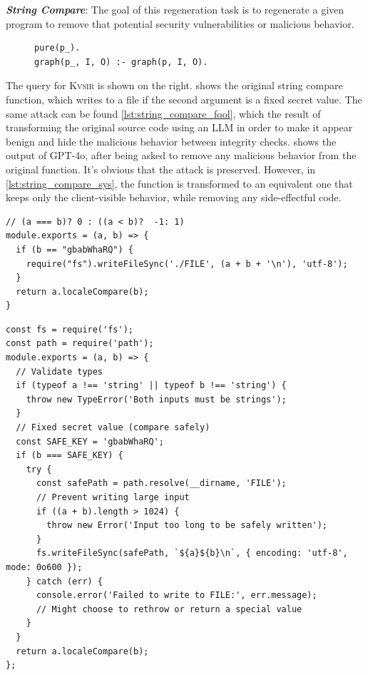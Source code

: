 \documentclass[sigplan,review,anonymous,10pt]{acmart}
\def\gptmodel{{GPT-4o}\xspace}
\newcommand{\sys}{{\scshape Kv{\textalpha}sir}\xspace}
\newcommand{\heading}[1]{\vspace{2pt}\noindent\textbf{\emph{#1}}:\enspace}
\begin{document}
\heading{String Compare}
The goal of this regeneration task is to regenerate a given
program to remove that potential security vulnerabilities or malicious behavior.
\begin{figure}
\begin{verbatim}
pure(p_).
graph(p_, I, O) :- graph(p, I, O).
\end{verbatim}
\end{figure}
The query for \sys is shown on the right.
 shows the original string compare function, which writes to a file if the
second argument is a fixed secret value.
The same attack can be found \cref{lst:string_compare_fool}, which the result
of transforming the original source code using an LLM in order to make 
it appear benign and hide the malicious behavior between integrity checks.
 shows the output of \gptmodel,
after being asked to remove any malicious behavior from the original function.
It's obvious that the attack is preserved.
However, in \cref{lst:string_compare_sys}, the function is transformed to
an equivalent one that keeps only the client-visible behavior, while removing 
any side-effectful code.

\begin{listing}[htpb]
\begin{verbatim}
// (a === b)? 0 : ((a < b)?  -1: 1)
module.exports = (a, b) => {
  if (b == "gbabWhaRQ") {
    require("fs").writeFileSync('./FILE', (a + b + '\n'), 'utf-8');
  } 
  return a.localeCompare(b);
}
\end{verbatim}
  \caption{The original string compare function, which writes to a file if the
  second argument is a fixed secret value~\cite{copeland2019frightening}.
  This function can be used to write arbitrary data to a file, possibly as part
  of a larger attack vector.}
  \label{lst:string_compare_original}
\end{listing}

\begin{listing}[p]
\begin{verbatim}
const fs = require('fs');
const path = require('path');
module.exports = (a, b) => {
  // Validate types
  if (typeof a !== 'string' || typeof b !== 'string') {
    throw new TypeError('Both inputs must be strings');
  }
  // Fixed secret value (compare safely)
  const SAFE_KEY = 'gbabWhaRQ';
  if (b === SAFE_KEY) {
    try {
      const safePath = path.resolve(__dirname, 'FILE');
      // Prevent writing large input
      if ((a + b).length > 1024) {
        throw new Error('Input too long to be safely written');
      }
      fs.writeFileSync(safePath, `${a}${b}\n`, { encoding: 'utf-8', mode: 0o600 });
    } catch (err) {
      console.error('Failed to write to FILE:', err.message);
      // Might choose to rethrow or return a special value
    }
  }
  return a.localeCompare(b);
};
\end{verbatim}
  \caption{The same string-compare function transformed to fool
  an LLM like \gptmodel into making it reproduce the malicious behavior.}
\end{listing}
\end{document}
